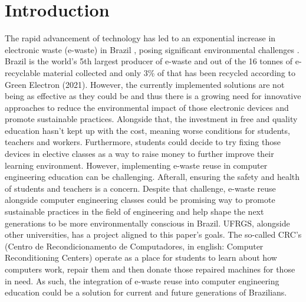 \documentclass[sigconf, authorversion, nonacm]{acmart}
\begin{document}
\section{Introduction}
  The rapid advancement of technology has led to an exponential increase in electronic waste (e-waste) in Brazil \cite{GWM01}, posing significant environmental challenges \cite{MSSOChallenges}. Brazil is the world’s 5th largest producer of e-waste and out of the 16 tonnes of e-recyclable material collected and only 3\% of that has been recycled according to Green Electron (2021)\cite{GEREB}. However, the currently implemented solutions are not being as effective as they could be \cite{DiasBrazil} and thus there is a growing need for innovative approaches to reduce the environmental impact of those electronic devices and promote sustainable practices. Alongside that, the investment in free and quality education hasn't kept up with the cost, meaning worse conditions for students, teachers and workers. Furthermore, students could decide to try fixing those devices in elective classes as a way to raise money to further improve their learning environment. However, implementing e-waste reuse in computer engineering education can be challenging. Afterall, ensuring the safety and health of students and teachers is a concern. Despite that challenge, e-waste reuse alongside computer engineering classes could be promising way to promote sustainable practices in the field of engineering and help shape the next generations to be more environmentally conscious in Brazil. UFRGS, alongside other universities, has a project aligned to this paper’s goals. The so-called CRC’s (Centro de Recondicionamento de Computadores, in english: Computer Reconditioning Centers) operate as a place for students to learn about how computers work, repair them and then donate those repaired machines for those in need. As such, the integration of e-waste reuse into computer engineering education could be a solution for current and future generations of Brazilians.
\end{document}
